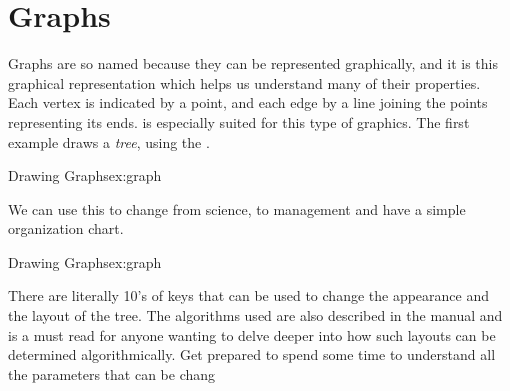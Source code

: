\chapter{Graphs}

Graphs are so named because they can be represented graphically, and it is this
graphical representation which helps us understand many of their properties. Each
vertex is indicated by a point, and each edge by a line joining the points representing
its ends. \tikzname is especially suited for this type of graphics. The first example draws a \textit{tree}, using the
.


\begin{texexample}{Drawing Graphs}{ex:graph}
\bgroup
{}
\egroup
\end{texexample}

We can use this to change from science, to management and have a simple organization chart.
\begin{texexample}{Drawing Graphs}{ex:graph}


\end{texexample}

There are literally 10's of keys that can be used to change the appearance and the layout of the tree. The algorithms used are also described in the manual and is a must read for anyone wanting to delve deeper into how such layouts can be determined algorithmically. Get prepared to spend some time to understand all the parameters that can be chang
